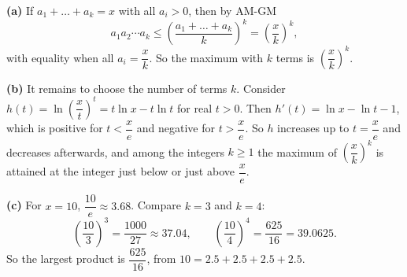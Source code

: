 \textbf{(a)} If $a_1+\dots+a_k=x$ with all $a_i>0$, then by AM-GM
\[
a_1a_2\cdots a_k\le\left(\dfrac{a_1+\dots+a_k}{k}\right)^k=\left(\dfrac {x}{k}\right)^k ,
\]
with equality when all $a_i=\dfrac {x}{k}$. So the maximum with $k$ terms is $\left(\dfrac {x}{k}\right)^k$.

\textbf{(b)} It remains to choose the number of terms $k$. Consider $h(t)=\ln\left(\dfrac {x}{t}\right)^t=t\ln x-t\ln t$ for real $t>0$. Then $h'(t)=\ln x-\ln t-1$, which is positive for $t<\dfrac {x}{e}$ and negative for $t>\dfrac {x}{e}$. So $h$ increases up to $t=\dfrac {x}{e}$ and decreases afterwards, and among the integers $k\ge1$ the maximum of $\left(\dfrac {x}{k}\right)^k$ is attained at the integer just below or just above $\dfrac {x}{e}$.

\textbf{(c)} For $x=10$, $\dfrac{10}{e}\approx3.68$. Compare $k=3$ and $k=4$:
\[
\left(\dfrac{10}{3}\right)^3=\dfrac{1000}{27}\approx37.04,\qquad\left(\dfrac{10}{4}\right)^4=\dfrac{625}{16}=39.0625 .
\]
So the largest product is $\boxed{\dfrac{625}{16}}$, from $10=2.5+2.5+2.5+2.5$.
